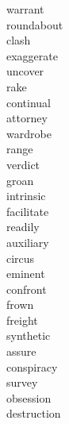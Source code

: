 \documentclass[b5paper, 11pt]{ctexart}
\begin{document}
\begin{multicols*}{3}
\begin{description}
\item[warrant]

\item[roundabout]

\item[clash]

\item[exaggerate]

\item[uncover]

\item[rake]

\item[continual]

\item[attorney]

\item[wardrobe]

\item[range]

\item[verdict]

\item[groan]

\item[intrinsic]

\item[facilitate]

\item[readily]

\item[auxiliary]

\item[circus]

\item[eminent]

\item[confront]

\item[frown]

\item[freight]

\item[synthetic]

\item[assure]

\item[conspiracy]

\item[survey]

\item[obsession]

\item[destruction]


\end{description}
\end{multicols*}
\end{document}
